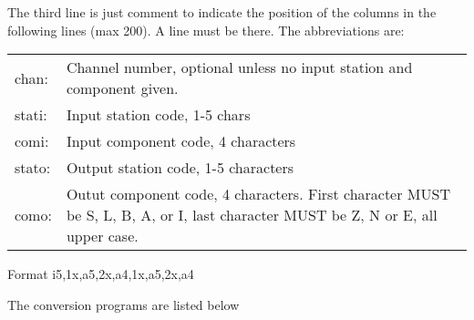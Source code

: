 The third line is just comment to indicate the position of the columns in the following lines (max 200). A line must be there. The abbreviations are: 

\begin{tabular}{lp{10cm}}
chan: & Channel number, optional unless no input station and component given. \\
stati: & Input station code, 1-5 chars \\
comi: & Input component code, 4 characters \\
stato: & Output station code, 1-5 characters \\
como: & Outut component code, 4 characters. First character MUST be S, L, B, A, or I,             last character MUST be Z, N or E, all upper case. \\
\end{tabular}

Format i5,1x,a5,2x,a4,1x,a5,2x,a4 

The conversion programs are listed below

